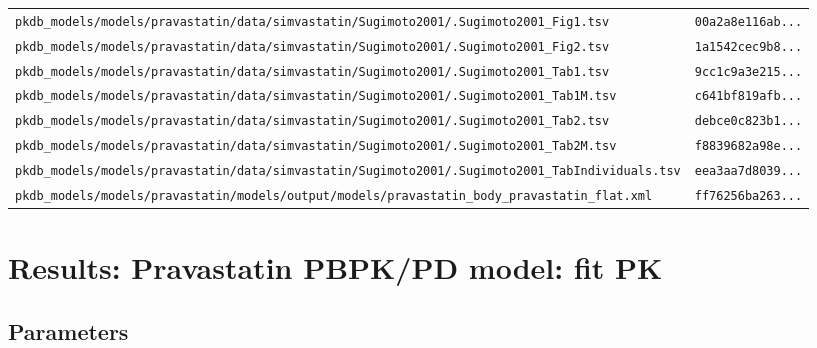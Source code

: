 \documentclass{article}
\begin{document}
\begin{longtable}{ll}
\texttt{pkdb\_models/models/pravastatin/data/simvastatin/Sugimoto2001/.Sugimoto2001\_Fig1.tsv} & \texttt{00a2a8e116ab...} \\
\texttt{pkdb\_models/models/pravastatin/data/simvastatin/Sugimoto2001/.Sugimoto2001\_Fig2.tsv} & \texttt{1a1542cec9b8...} \\
\texttt{pkdb\_models/models/pravastatin/data/simvastatin/Sugimoto2001/.Sugimoto2001\_Tab1.tsv} & \texttt{9cc1c9a3e215...} \\
\texttt{pkdb\_models/models/pravastatin/data/simvastatin/Sugimoto2001/.Sugimoto2001\_Tab1M.tsv} & \texttt{c641bf819afb...} \\
\texttt{pkdb\_models/models/pravastatin/data/simvastatin/Sugimoto2001/.Sugimoto2001\_Tab2.tsv} & \texttt{debce0c823b1...} \\
\texttt{pkdb\_models/models/pravastatin/data/simvastatin/Sugimoto2001/.Sugimoto2001\_Tab2M.tsv} & \texttt{f8839682a98e...} \\
\texttt{pkdb\_models/models/pravastatin/data/simvastatin/Sugimoto2001/.Sugimoto2001\_TabIndividuals.tsv} & \texttt{eea3aa7d8039...} \\
\texttt{pkdb\_models/models/pravastatin/models/output/models/pravastatin\_body\_pravastatin\_flat.xml} & \texttt{ff76256ba263...} \\
\end{longtable}

\section{Results: Pravastatin PBPK/PD model: fit PK}

\subsection{Parameters}
\end{document}
